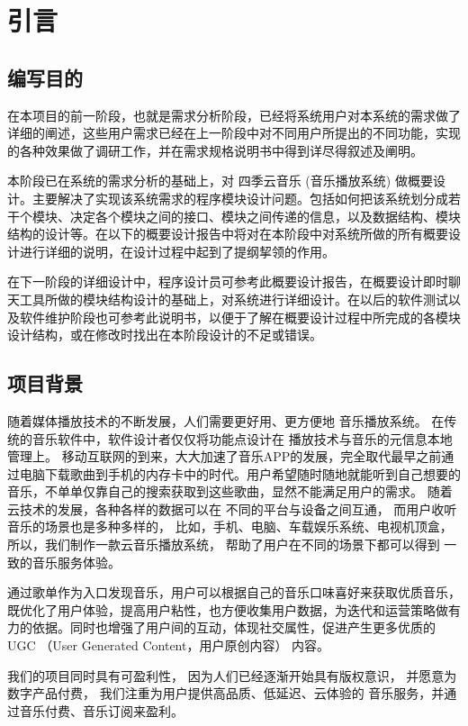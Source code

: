 \chapter{引言}
\section{编写目的}
在本项目的前一阶段，也就是需求分析阶段，已经将系统用户对本系统的需求做了详细的阐述，这些用户需求已经在上一阶段中对不同用户所提出的不同功能，实现的各种效果做了调研工作，并在需求规格说明书中得到详尽得叙述及阐明。

本阶段已在系统的需求分析的基础上，对
四季云音乐 (音乐播放系统)
做概要设计。主要解决了实现该系统需求的程序模块设计问题。包括如何把该系统划分成若干个模块、决定各个模块之间的接口、模块之间传递的信息，以及数据结构、模块结构的设计等。在以下的概要设计报告中将对在本阶段中对系统所做的所有概要设计进行详细的说明，在设计过程中起到了提纲挈领的作用。

在下一阶段的详细设计中，程序设计员可参考此概要设计报告，在概要设计即时聊天工具所做的模块结构设计的基础上，对系统进行详细设计。在以后的软件测试以及软件维护阶段也可参考此说明书，以便于了解在概要设计过程中所完成的各模块设计结构，或在修改时找出在本阶段设计的不足或错误。


\section{项目背景}
随着媒体播放技术的不断发展，人们需要更好用、更方便地
音乐播放系统。
在传统的音乐软件中，软件设计者仅仅将功能点设计在
播放技术与音乐的元信息本地管理上。
移动互联网的到来，大大加速了音乐APP的发展，完全取代最早之前通过电脑下载歌曲到手机的内存卡中的时代。用户希望随时随地就能听到自己想要的音乐，不单单仅靠自己的搜索获取到这些歌曲，显然不能满足用户的需求。
随着云技术的发展，各种各样的数据可以在
不同的平台与设备之间互通，
而用户收听音乐的场景也是多种多样的，
比如，手机、电脑、车载娱乐系统、电视机顶盒，
所以，我们制作一款云音乐播放系统，
帮助了用户在不同的场景下都可以得到
一致的音乐服务体验。

通过歌单作为入口发现音乐，用户可以根据自己的音乐口味喜好来获取优质音乐，既优化了用户体验，提高用户粘性，也方便收集用户数据，为迭代和运营策略做有力的依据。同时也增强了用户间的互动，体现社交属性，促进产生更多优质的UGC
（User Generated Content，用户原创内容）
内容。

我们的项目同时具有可盈利性，
因为人们已经逐渐开始具有版权意识，
并愿意为数字产品付费，
我们注重为用户提供高品质、低延迟、云体验的
音乐服务，并通过音乐付费、音乐订阅来盈利。



